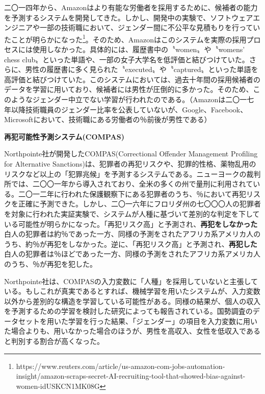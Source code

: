 \documentclass[b5j,twoside,twocolumn]{utarticle}
\begin{document}
二〇一四年から、Amazonはより有能な労働者を採用するために、候補者の能力を予測するシステムを開発してきた。しかし、開発中の実験で、ソフトウェアエンジニアや一部の技術職において、ジェンダー間に不公平な見積もりを行っていたことが明らかになった\footnote{https://www.reuters.com/article/us-amazon-com-jobs-automation-insight/amazon-scraps-secret-AI-recruiting-tool-that-showed-bias-against-women-idUSKCN1MK08G}。そのため、Amazonはこのシステムを実際の採用プロセスには使用しなかった。具体的には、履歴書中の〝women〟や〝womens' chess club〟といった単語や、一部の女子大学名を低評価と結びつけていた。さらに、男性の履歴書に多く見られた〝executed〟や〝captured〟といった単語を高評価と結びつけていた。このシステムにおいては、過去十年間の採用候補者のデータを学習に用いており、候補者には男性が圧倒的に多かった。そのため、このようなジェンダー中立でない学習が行われたのである。（Amazonは二〇一七年以降技術職員のジェンダー比率を公表していないが、Google、Facebook、Microsoftにおいて、技術職にある労働者の％前後が男性である）


\noindent\textbf{再犯可能性予測システム(COMPAS)}


Northpointe社が開発したCOMPAS(Correctional Offender Management Profiling for Alternative Sanctions)は、犯罪者の再犯リスクや、犯罪的性格、薬物乱用のリスクなど以上の「犯罪兆候」を予測するシステムである。ニューヨークの裁判所では、二〇〇一年から導入されており、全米の多くの州で量刑に利用されている。二〇一二年に行われた保護観察下にある犯罪者のうち、％において再犯リスクを正確に予測できた。しかし、二〇一六年にフロリダ州の七〇〇〇人の犯罪者を対象に行われた実証実験\cite{compas}で、システムが人種に基づいて差別的な判定を下している可能性が明らかになった。「再犯リスク高」と予測され、\textbf{再犯をしなかった}白人の犯罪者は約％であった一方、同様の予測をされたアフリカ系アメリカ人のうち、約％が再犯をしなかった。逆に、「再犯リスク高」と予測され、\textbf{再犯した}白人の犯罪者は％ほどであった一方、同様の予測をされたアフリカ系アメリカ人のうち、％が再犯を犯した。

Northpointe社は、COMPASの入力変数に「人種」を採用していないと主張している。もしこれが真実であるとすれば、機械学習を用いたシステムが、入力変数以外から差別的な構造を学習している可能性がある。同様の結果が、個人の収入を予測するための学習を検討した研究によっても報告されている。国勢調査のデータセットを用いた学習を行った結果、「ジェンダー」の項目を入力変数に用いた場合よりも、用いなかった場合のほうが、男性を高収入、女性を低収入であると判別する割合が高くなった\cite{Calders2010}。
\end{document}

